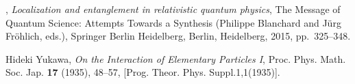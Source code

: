 \documentclass[12pt]{article}
\newcommand{\1}{\mathds{1}}                         %
\begin{document}
{\begin{thebibliography}{BDFY15}
	\bysame, \emph{Localization and entanglement in relativistic quantum physics},
	The Message of Quantum Science: Attempts Towards a Synthesis (Philippe
	Blanchard and J{\"u}rg Fr{\"o}hlich, eds.), Springer Berlin Heidelberg,
	Berlin, Heidelberg, 2015, pp.~325--348.
	
	Hideki Yukawa, \emph{{On the Interaction of Elementary Particles I}}, Proc.
	Phys. Math. Soc. Jap. \textbf{17} (1935), 48--57, [Prog. Theor. Phys.
	Suppl.1,1(1935)].
	
\end{thebibliography}}
\end{document}

